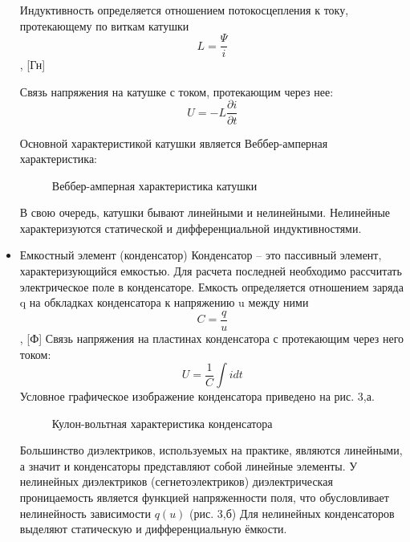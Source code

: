 \begin{itemize}
	Индуктивность определяется отношением потокосцепления к току, протекающему по виткам катушки
$$L =  \frac{\Psi}{i} $$
, [Гн]

	Связь напряжения на катушке с током, протекающим через нее:
$$ U = -L \frac{\partial i}{\partial t} $$

	Основной характеристикой катушки является Веббер-амперная характеристика:
\begin{center}
	\begin{figure}[h!]
		\caption{ Веббер-амперная характеристика катушки}	
	\end{figure}
\end{center}


	В свою очередь, катушки бывают линейными и нелинейными. Нелинейные характеризуются статической и дифференциальной индуктивностями.
 
\item  Емкостный элемент (конденсатор)
	Конденсатор – это пассивный элемент, характеризующийся емкостью. Для расчета последней необходимо рассчитать электрическое поле в конденсаторе. Емкость определяется отношением заряда q на обкладках конденсатора к напряжению u между ними
$$C = \frac{q}{u} $$
, [Ф]
	Связь напряжения на пластинах конденсатора с протекающим через него током:
$$ U = \frac{1}{C}\int i dt $$
	Условное графическое изображение конденсатора приведено на рис. 3,а.
\begin{center}
	\begin{figure}[h!]
		\caption{ Кулон-вольтная характеристика конденсатора}	
	\end{figure}
\end{center}
	Большинство диэлектриков, используемых на практике, являются линейными, а значит и конденсаторы представляют собой линейные элементы. У нелинейных диэлектриков (сегнетоэлектриков) диэлектрическая проницаемость является функцией напряженности поля, что обусловливает нелинейность зависимости $q(u)$ (рис. 3,б)
	Для нелинейных конденсаторов выделяют статическую и дифференциальную ёмкости.
\end{itemize}
